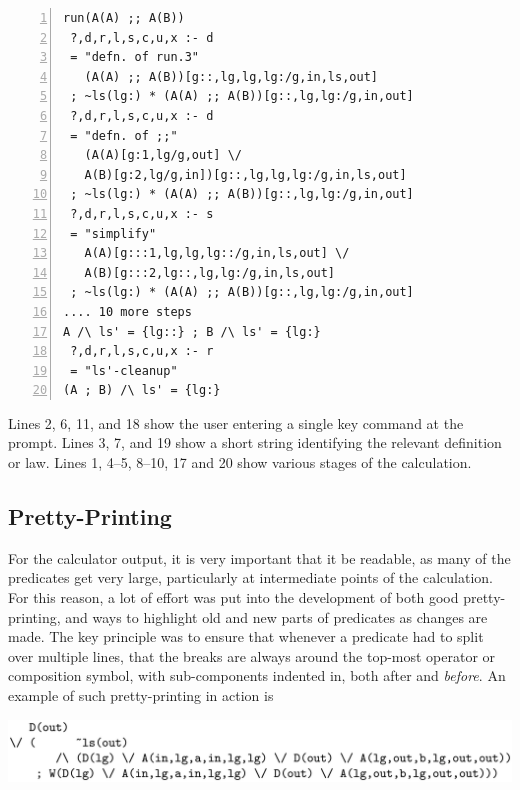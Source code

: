\begin{lstlisting}[basicstyle=\ttfamily, numbers=left, numberstyle=\tiny, numbersep=5pt]
run(A(A) ;; A(B))
 ?,d,r,l,s,c,u,x :- d
 = "defn. of run.3"
   (A(A) ;; A(B))[g::,lg,lg,lg:/g,in,ls,out]
 ; ~ls(lg:) * (A(A) ;; A(B))[g::,lg,lg:/g,in,out]
 ?,d,r,l,s,c,u,x :- d
 = "defn. of ;;"
   (A(A)[g:1,lg/g,out] \/
   A(B)[g:2,lg/g,in])[g::,lg,lg,lg:/g,in,ls,out]
 ; ~ls(lg:) * (A(A) ;; A(B))[g::,lg,lg:/g,in,out]
 ?,d,r,l,s,c,u,x :- s
 = "simplify"
   A(A)[g:::1,lg,lg,lg::/g,in,ls,out] \/
   A(B)[g:::2,lg::,lg,lg:/g,in,ls,out]
 ; ~ls(lg:) * (A(A) ;; A(B))[g::,lg,lg:/g,in,out]
.... 10 more steps
A /\ ls' = {lg::} ; B /\ ls' = {lg:}
 ?,d,r,l,s,c,u,x :- r
 = "ls'-cleanup"
(A ; B) /\ ls' = {lg:}
\end{lstlisting}
Lines 2, 6, 11, and 18 show the user entering a single key command at the prompt.
Lines 3, 7, and 19 show a short string identifying the relevant definition
or law.
Lines 1, 4--5, 8--10, 17 and 20 show various stages of the calculation.



\subsection{Pretty-Printing}\label{ssec:pp}

For the calculator output,
it is very important that it be readable,
as many of the predicates get very large,
particularly at intermediate points of the calculation.
For this reason, a lot of effort was put into the development
of both good pretty-printing,
and ways to highlight old and new parts of predicates as changes are made.
The key principle was to ensure that whenever a predicate
had to split over multiple lines,
that the breaks are always around the top-most operator or composition
symbol, with sub-components indented in, both after and \emph{before}.
An example of such pretty-printing in action is

\noindent
\includegraphics[scale=0.155]{pprint-xmpl.eps}

